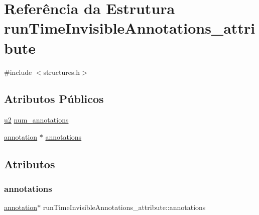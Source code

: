 \hypertarget{structrunTimeInvisibleAnnotations__attribute}{}\section{Referência da Estrutura run\+Time\+Invisible\+Annotations\+\_\+attribute}
\label{structrunTimeInvisibleAnnotations__attribute}


{\ttfamily \#include $<$structures.\+h$>$}

\subsection*{Atributos Públicos}
\begin{DoxyCompactItemize}
\item 
\hyperlink{lista__operandos_8h_a732cde1300aafb73b0ea6c2558a7a54f}{u2} \hyperlink{structrunTimeInvisibleAnnotations__attribute_a703d15c7112b673ff31b7e4b2d85782b}{num\+\_\+annotations}
\item 
\hyperlink{structannotation}{annotation} $\ast$ \hyperlink{structrunTimeInvisibleAnnotations__attribute_a8f62eb72b381abe0fcc559ad874cf60b}{annotations}
\end{DoxyCompactItemize}


\subsection{Atributos}
\mbox{\label{structrunTimeInvisibleAnnotations__attribute_a8f62eb72b381abe0fcc559ad874cf60b}} 
\subsubsection{\texorpdfstring{annotations}{annotations}}
{\footnotesize\ttfamily \hyperlink{structannotation}{annotation}$\ast$ run\+Time\+Invisible\+Annotations\+\_\+attribute\+::annotations}

\mbox{\label{structrunTimeInvisibleAnnotations__attribute_a703d15c7112b673ff31b7e4b2d85782b}} 
